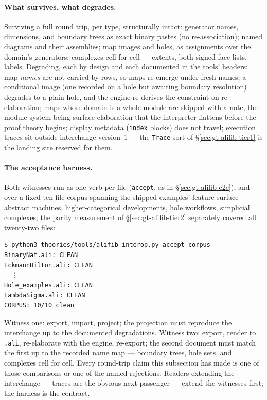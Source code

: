 \paragraph{What survives, what degrades.} Surviving a full round trip,
per type, structurally intact: generator names, dimensions, and
boundary trees as exact binary pastes (no re-association); named
diagrams and their assemblies; map images and holes, as assignments
over the domain's generators; complexes cell for cell --- extents,
both signed face lists, labels. Degrading, each by design and each
documented in the tools' headers: map \emph{names} are not carried by
rows, so maps re-emerge under fresh names; a conditional image (one
recorded on a hole but awaiting boundary resolution) degrades to a
plain hole, and the engine re-derives the constraint on
re-elaboration; maps
whose domain is a whole module are skipped with a note, the module
system being surface elaboration that the interpreter flattens before
the proof theory begins; display metadata (\texttt{index} blocks) does
not travel; execution traces sit outside interchange version~1 ---
the \texttt{Trace} sort of \S\ref{sec:gt-alifib-tier1} is the landing
site reserved for them.

\paragraph{The acceptance harness.} Both witnesses run as one verb per
file (\texttt{accept}, as in \S\ref{sec:gt-alifib-e2e}), and over a
fixed ten-file corpus spanning the shipped examples' feature surface
--- abstract machines, higher-categorical developments, hole
workflows, simplicial complexes; the parity measurement of
\S\ref{sec:gt-alifib-tier2} separately covered all twenty-two files:

\begin{Verbatim}[fontsize=\small,frame=leftline,rulecolor=\color{accentmid},framesep=3mm,xleftmargin=3mm]
$ python3 theories/tools/alifib_interop.py accept-corpus
BinaryNat.ali: CLEAN
EckmannHilton.ali: CLEAN
  ⋮
Hole_examples.ali: CLEAN
LambdaSigma.ali: CLEAN
CORPUS: 10/10 clean
\end{Verbatim}

\noindent Witness one: export, import, project; the projection must
reproduce the interchange up to the documented degradations. Witness
two: export, render to \texttt{.ali}, re-elaborate with the engine,
re-export; the second document must match the first up to the recorded
name map --- boundary trees, hole sets, and complexes cell for cell.
Every round-trip claim this subsection has made is one of those
comparisons or one of the named rejections. Readers extending the
interchange --- traces are the obvious next passenger --- extend the
witnesses first; the harness is the contract.

